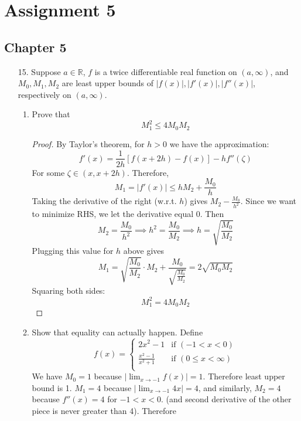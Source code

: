 \documentclass[hidelinks,12pt]{article}
\title{\scalebox{1.5}{Math 723 Homework 4}}
\author{\scalebox{1.5}{Theo Koss}}
\date{October 2024}
\renewcommand{\leq}{\leqslant}
\newcommand{\R}{\mathbb{R}}
\begin{document}
\maketitle
\section*{Assignment 5}
\subsection*{Chapter 5}
\begin{enumerate}
    \item[15.] Suppose \(a\in\R\), \(f\) is a twice differentiable real function on \((a,\infty)\), and \(M_{0},M_{1},M_{2}\) are least upper bounds of \(|f(x)|,|f'(x)|,|f''(x)|\), respectively on \((a,\infty)\). 
        \begin{enumerate}[label=(\alph*).]
            \item Prove that \[
    M_{1}^{2}\leq 4M_{0}M_{2}
    \]
    \begin{proof}
   By Taylor's theorem, for \(h>0\) we have the approximation: \[
       f'(x)=\frac{1}{2h}\left[f(x+2h)-f(x)\right]-hf''(\zeta) 
   \]
  For some \(\zeta\in(x,x+2h)\). Therefore, \[
  M_{1}=|f'(x)|\leq hM_{2}+\frac{M_{0}}{h}
  \]
Taking the derivative of the right (w.r.t. \(h\)) gives \(M_{2}-\frac{M_{0}}{h^{2}}\). Since we want to minimize RHS, we let the derivative equal 0. Then \[
    M_{2}=\frac{M_{0}}{h^{2}}\implies h^{2}=\frac{M_{0}}{M_{2}}\implies h=\sqrt{\frac{M_{0}}{M_{2}}}
\]
Plugging this value for \(h\) above gives 
\[
    M_{1}=\sqrt{\frac{M_{0}}{M_{2}}}\cdot M_{2}+\frac{M_{0}}{\sqrt{\frac{M_{0}}{M_{2}}}}=2\sqrt{M_{0}M_{2}}
\]
Squaring both sides:\[
M_{1}^{2}=4M_{0}M_{2}
\]
   \end{proof}
            \item Show that equality can actually happen. Define \[
            f(x)=\begin{cases}
            2x^{2}-1 & \text{if }(-1<x<0)\\
             \frac{x^{2}-1}{x^{2}+1}& \text{if }(0\leq x<\infty)\\
            \end{cases}
            \]
           We have \(M_{0}=1\) because \(|\lim_{x\to-1}f(x)|=1\). Therefore least upper bound is 1. \(M_{1}=4\) because \(|\lim_{x\to-1}4x|=4\), and similarly, \(M_{2}=4\) because \(f''(x)=4\) for \(-1<x<0\). (and second derivative of the other piece is never greater than 4). Therefore
           \[
\]
\end{enumerate}
\end{enumerate}
\end{document}

